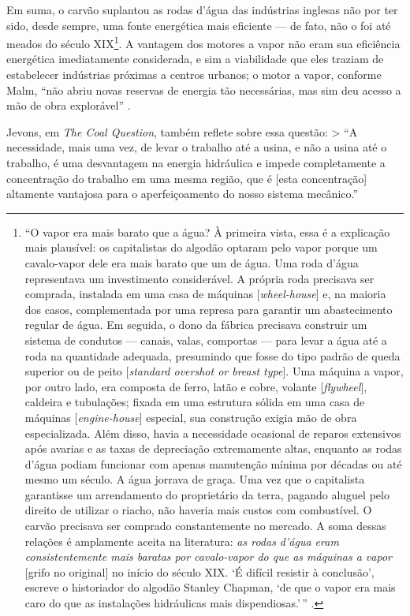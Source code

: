 Em suma, o carvão suplantou as rodas d'água das indústrias inglesas não por ter sido, desde sempre, uma fonte energética mais eficiente --- de fato, não o foi até meados do século XIX\footnote{``O vapor era mais barato que a água? À primeira vista, essa é a explicação mais plausível: os capitalistas do algodão optaram pelo vapor porque um cavalo-vapor dele era mais barato que um de água. Uma roda d'água representava um investimento considerável. A própria roda precisava ser comprada, instalada em uma casa de máquinas {[}\textit{wheel-house}{]} e, na maioria dos casos, complementada por uma represa para garantir um abastecimento regular de água. Em seguida, o dono da fábrica precisava construir um sistema de condutos --- canais, valas, comportas --- para levar a água até a roda na quantidade adequada, presumindo que fosse do tipo padrão de queda superior ou de peito {[}\textit{standard overshot or breast type}{]}. Uma máquina a vapor, por outro lado, era composta de ferro, latão e cobre, volante {[}\textit{flywheel}{]}, caldeira e tubulações; fixada em uma estrutura sólida em uma casa de máquinas {[}\textit{engine-house}{]} especial, sua construção exigia mão de obra especializada. Além disso, havia a necessidade ocasional de reparos extensivos após avarias e as taxas de depreciação extremamente altas, enquanto as rodas d'água podiam funcionar com apenas manutenção mínima por décadas ou até mesmo um século. A água jorrava de graça. Uma vez que o capitalista garantisse um arrendamento do proprietário da terra, pagando aluguel pelo direito de utilizar o riacho, não haveria mais custos com combustível. O carvão precisava ser comprado constantemente no mercado. A soma dessas relações é amplamente aceita na literatura: \textit{as rodas d'água eram consistentemente mais baratas por cavalo-vapor do que as máquinas a vapor} {[}grifo no original{]} no início do século XIX. `É difícil resistir à conclusão', escreve o historiador do algodão Stanley Chapman, `de que o vapor era mais caro do que as instalações hidráulicas mais dispendiosas.'\,'' \parencite[, p. 29-30]{Malm2013}.}. A vantagem dos motores a vapor não eram sua eficiência energética imediatamente considerada, e sim a viabilidade que eles traziam de estabelecer indústrias próximas a centros urbanos; o motor a vapor, conforme Malm, ``não abriu novas reservas de energia tão necessárias, mas sim deu acesso a mão de obra explorável'' \parencite[, p. 33]{Malm2013}.

Jevons, em \textit{The Coal Question}, também reflete sobre essa questão: \textgreater{} ``A necessidade, mais uma vez, de levar o trabalho até a usina, e não a usina até o trabalho, é uma desvantagem na energia hidráulica e impede completamente a concentração do trabalho em uma mesma região, que é {[}esta concentração{]} altamente vantajosa para o aperfeiçoamento do nosso sistema mecânico.'' \parencite[, p. 89]{Jevons1866}

